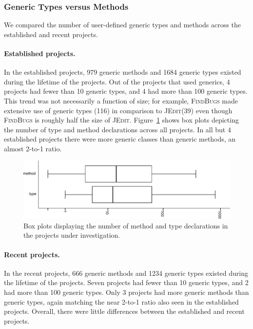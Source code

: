 \documentclass{svjour3}
\newcommand{\jedit}{\textsc{JEdit}\xspace}
\newcommand{\findbugs}{\textsc{FindBugs}\xspace}
\begin{document}
\subsubsection{Generic Types versus Methods}

We compared the number of user-defined generic types and methods across the established and recent projects.

\paragraph{Established projects.}In the established projects, 979 generic methods and 1684 generic types existed during the lifetime of the projects.
Out of the projects that used generics, 4 projects had fewer than 10 generic types, and 4 had more than 100 generic types.
This trend was not necessarily a function of size; for example, \findbugs made extensive use of generic types (116) in comparison to \jedit (39) even though \findbugs is roughly half the size of \jedit.
Figure~\ref{fig:decl-boxplot} shows box plots depicting the number of type and method declarations across all projects.
In all but 4 established projects there were more generic classes than generic methods, an almost 2-to-1 ratio. 

\begin{figure}[t]
	\includegraphics[width=\textwidth]{decl-boxplot.pdf}
	\caption{Box plots displaying the number of method and type declarations 
	in the projects under investigation.}
	\label{fig:decl-boxplot}
\end{figure}

\paragraph{Recent projects.}In the recent projects, 666 generic methods and 1234 generic types existed during the lifetime of the projects.
Seven projects had fewer than 10 generic types, and 2 had more than 100 generic types.  Only 3 projects had more generic methods than generic types, again matching the near 2-to-1 ratio 
also seen in the established projects.  Overall, there were little differences between the established and recent projects.
\end{document}

